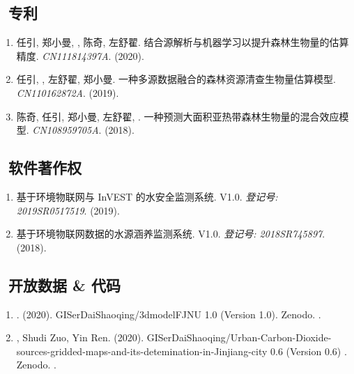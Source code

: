 \subsection*{\texorpdfstring{\faBook\ 专利}{专利}}
\begin{enumerate}
\item
     任引, 郑小曼, {}, 陈奇, 左舒翟.
     结合源解析与机器学习以提升森林生物量的估算精度.
     \textit{CN111814397A}. (2020).
\item
     任引, {}, 左舒翟, 郑小曼.
     一种多源数据融合的森林资源清查生物量估算模型.
     \textit{CN110162872A}. (2019).
\item
     陈奇, 任引, 郑小曼, 左舒翟, {}.
     一种预测大面积亚热带森林生物量的混合效应模型.
     \textit{CN108959705A}. (2018).
\end{enumerate}

\subsection*{\texorpdfstring{\faBook\ 软件著作权}{软件著作权}}
\begin{enumerate}
\item
   基于环境物联网与 InVEST 的水安全监测系统. V1.0.
    \textit{登记号: 2019SR0517519}. (2019).
\item
    基于环境物联网数据的水源涵养监测系统. V1.0.
    \textit{登记号: 2018SR745897}. (2018).
\end{enumerate}

\subsection*{\texorpdfstring{\faBook\ 开放数据 \& 代码}{开放数据 \& 代码}}
\begin{enumerate}
\item
   \Shaoqing. (2020).
    GISerDaiShaoqing/3dmodelFJNU 1.0 (Version 1.0). Zenodo. 
    .
\item
   \Shaoqing, Shudi Zuo, Yin Ren. (2020).
    GISerDaiShaoqing/Urban-Carbon-Dioxide-sources-gridded-maps-and-its-detemination-in-Jinjiang-city 0.6 (Version 0.6) . Zenodo. 
    .
\end{enumerate}

